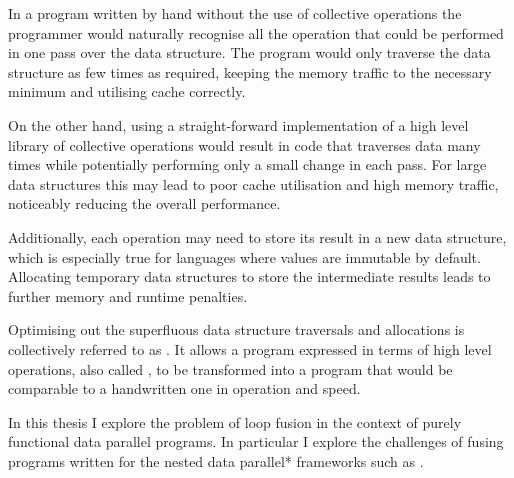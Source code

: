 \documentclass[preamble.tex]{subfiles}
\begin{document}
In a program written by hand without the use of collective operations the programmer would naturally recognise all the operation that could be performed in one pass over the data structure. The program would only traverse the data structure as few times as required, keeping the memory traffic to the necessary minimum and utilising cache correctly.

On the other hand, using a straight-forward implementation of a high level library of collective operations would result in code that traverses data many times while potentially performing only a small change in each pass. For large data structures this may lead to poor cache utilisation and high memory traffic, noticeably reducing the overall performance.

Additionally, each operation may need to store its result in a new data structure, which is especially true for languages where values are immutable by default. Allocating temporary data structures to store the intermediate results leads to further memory and runtime penalties.

Optimising out the superfluous data structure traversals and allocations is collectively referred to as \ifusion{}. It allows a program expressed in terms of high level operations, also called \icomb{}, to be transformed into a program that would be comparable to a handwritten one in operation and speed.

In this thesis I explore the problem of loop fusion in the context of purely functional data parallel programs. In particular I explore the challenges of fusing programs written for the \*nested data parallel* frameworks such as .
\end{document}
